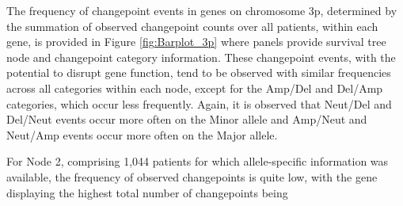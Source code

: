 The frequency of changepoint events in genes on chromosome 3p, determined by the summation of observed changepoint counts over all patients, within each gene, is provided in Figure \ref{fig:Barplot_3p} where panels provide survival tree node and changepoint category information. These changepoint events, with the potential to disrupt gene function, tend to be observed with similar frequencies across all categories within each node, except for the Amp/Del and Del/Amp categories, which occur less frequently. Again, it is observed that Neut/Del and Del/Neut events occur more often on the Minor allele and Amp/Neut and Neut/Amp events occur more often on the Major allele. 

For Node 2, comprising 1,044 patients for which allele-specific information was available, the frequency of observed changepoints is quite low, with the gene displaying the highest total number of changepoints being 

